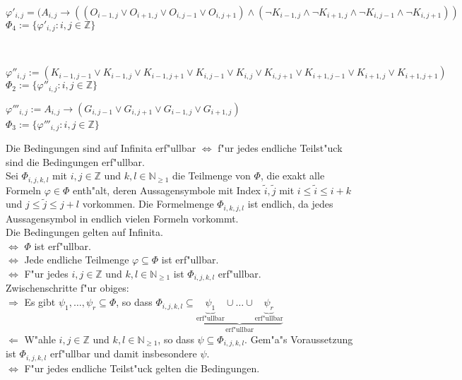 \documentclass[a4paper,10pt]{article}
\begin{document}
\begin{compactenum} [(a)]
\begin{compactitem}
			\item $ \varphi'_{i,j} = (A_{i,j} \rightarrow ((O_{i-1,j} \vee O_{i+1,j} \vee O_{i,j-1} \vee O_{i,j+1}) \wedge (\lnot K_{i-1,j} \wedge \lnot K_{i+1,j} \wedge \lnot K_{i,j-1} \wedge \lnot K_{i,j+1})) $ \\
			$ \varPhi_4 := \{\varphi'_{i,j} : i,j \in \mathbb{Z}\} $
		\end{compactitem}\
		\item $ \varphi''_{i,j} := (K_{i-1,j-1}\vee K_{i-1,j}\vee K_{i-1,j+1}\vee K_{i,j-1}\vee K_{i,j}\vee K_{i,j+1}\vee K_{i+1,j-1}\vee K_{i+1,j}\vee K_{i+1,j+1}) $ \\
		$ \varPhi_2 := \{\varphi''_{i,j} : i,j \in \mathbb{Z}\} $\\
		\item $ \varphi'''_{i,j} := A_{i,j}\rightarrow(G_{i,j-1}\vee G_{i,j+1}\vee G_{i-1,j}\vee G_{i+1,j}) $ \\
		$ \varPhi_3 := \{\varphi'''_{i,j} : i,j \in \mathbb{Z} \} $\ \\
		\item Die Bedingungen sind auf Infinita erf"ullbar $\Leftrightarrow$ f"ur jedes endliche Teilst"uck sind die Bedingungen erf"ullbar.\\
		Sei $\Phi_{i,j,k,l}$ mit $i,j \in \mathbb{Z}$ und $k,l \in \mathbb{N}_{\geq 1}$ die Teilmenge von $\Phi$, die exakt alle Formeln $\varphi \in \Phi$ enth"alt, deren Aussagensymbole mit Index $\tilde{i}, \tilde{j}$ mit $i \leq \tilde{i} \leq i + k$ und $j \leq \tilde{j} \leq j + l$ vorkommen. Die Formelmenge $\Phi_{i,k,j,l}$ ist endlich, da jedes Aussagensymbol in endlich vielen Formeln vorkommt.\\
		Die Bedingungen gelten auf Infinita.\\
		$\Leftrightarrow$ $\Phi$ ist erf"ullbar.\\
		$\Leftrightarrow$ Jede endliche Teilmenge $\varphi \subseteq \Phi$ ist erf"ullbar.\\
		$\Leftrightarrow$ F"ur jedes $i,j \in \mathbb{Z}$ und $k,l \in \mathbb{N}_{\geq 1}$ ist $\Phi_{i,j,k,l}$ erf"ullbar.\\
		Zwischenschritte f"ur obiges:\\
		$\Rightarrow$ Es gibt $\psi_1, \dots , \psi_r \subseteq \Phi$, so dass $\Phi_{i,j,k,l} \subseteq \underbrace{\underbrace{\psi_1}_{\text{erf"ullbar}} \cup \dots \cup \underbrace{\psi_r}_{\text{erf"ullbar}}}_{\text{erf"ullbar}}$\\
		$\Leftarrow$ W"ahle $i,j \in \mathbb{Z}$ und $k,l \in \mathbb{N}_{\geq 1}$, so dass $\psi \subseteq \Phi_{i,j,k,l}$. Gem"a"s Voraussetzung ist $\Phi_{i,j,k,l}$ erf"ullbar und damit insbesondere $\psi$.\\
		$\Leftrightarrow$ F"ur jedes endliche Teilst"uck gelten die Bedingungen.\\
		
	\end{compactenum} \
\end{document}
